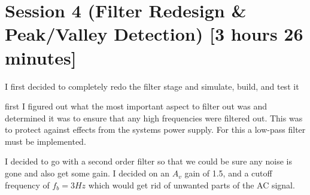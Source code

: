 \documentclass{article}
\begin{document}
\section{Session 4 (Filter Redesign \& Peak/Valley Detection) [3 hours 26 minutes]}
I first decided to completely redo the filter stage and simulate, build, and test it

first I figured out what the most important aspect to filter out was and determined it was to ensure that any high frequencies were filtered out. This was to protect against effects from the systems power supply. For this a low-pass filter must be implemented. 

I decided to go with a second order filter so that we could be sure any noise is gone and also get some gain. I decided on an $A_v$ gain of 1.5, and a cutoff frequency of $f_b = 3Hz$ which would get rid of unwanted parts of the AC signal.
\end{document}
